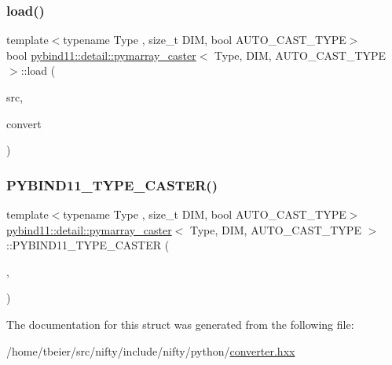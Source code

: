 \mbox{\label{structpybind11_1_1detail_1_1pymarray__caster_a86104f2febd079f88902bfbcaf211275}} 
\subsubsection{\texorpdfstring{load()}{load()}}
{\footnotesize\ttfamily template$<$typename Type , size\+\_\+t D\+IM, bool A\+U\+T\+O\+\_\+\+C\+A\+S\+T\+\_\+\+T\+Y\+PE$>$ \\
bool \hyperlink{structpybind11_1_1detail_1_1pymarray__caster}{pybind11\+::detail\+::pymarray\+\_\+caster}$<$ Type, D\+IM, A\+U\+T\+O\+\_\+\+C\+A\+S\+T\+\_\+\+T\+Y\+PE $>$\+::load (\begin{DoxyParamCaption}\item[{handle}]{src,  }\item[{bool}]{convert }\end{DoxyParamCaption})\hspace{0.3cm}{\ttfamily [inline]}}

\mbox{\label{structpybind11_1_1detail_1_1pymarray__caster_a40c677529b61ffbe09c3031a28c17bfd}} 
\subsubsection{\texorpdfstring{P\+Y\+B\+I\+N\+D11\+\_\+\+T\+Y\+P\+E\+\_\+\+C\+A\+S\+T\+E\+R()}{PYBIND11\_TYPE\_CASTER()}}
{\footnotesize\ttfamily template$<$typename Type , size\+\_\+t D\+IM, bool A\+U\+T\+O\+\_\+\+C\+A\+S\+T\+\_\+\+T\+Y\+PE$>$ \\
\hyperlink{structpybind11_1_1detail_1_1pymarray__caster}{pybind11\+::detail\+::pymarray\+\_\+caster}$<$ Type, D\+IM, A\+U\+T\+O\+\_\+\+C\+A\+S\+T\+\_\+\+T\+Y\+PE $>$\+::P\+Y\+B\+I\+N\+D11\+\_\+\+T\+Y\+P\+E\+\_\+\+C\+A\+S\+T\+ER (\begin{DoxyParamCaption}\item[{\hyperlink{structpybind11_1_1detail_1_1pymarray__caster_a0593b33c0ed08f1b25b34dbc3da1b01c}{View\+Type}}]{,  }\item[{\+\_\+(\char`\"{}array$<$\char`\"{})+value\+\_\+conv\+::name()+\+\_\+(\char`\"{}$>$\char`\"{})}]{ }\end{DoxyParamCaption})}



The documentation for this struct was generated from the following file\+:\begin{DoxyCompactItemize}
\item 
/home/tbeier/src/nifty/include/nifty/python/\hyperlink{converter_8hxx}{converter.\+hxx}\end{DoxyCompactItemize}
